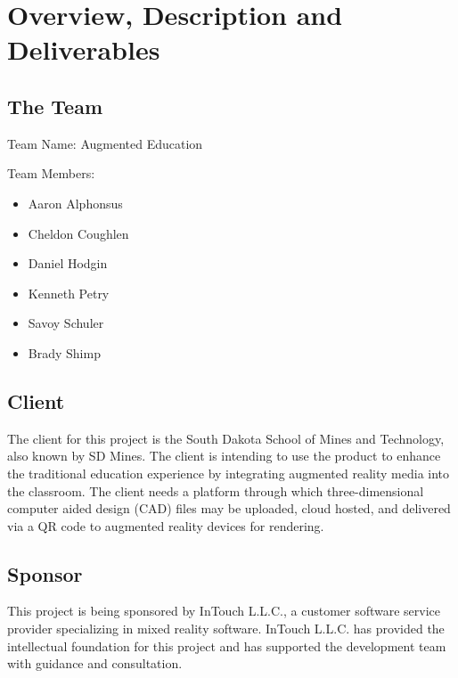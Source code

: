 

\chapter{Overview, Description and Deliverables}


\section{The Team}

Team Name: Augmented Education

\noindent Team Members:
\begin{itemize}
	\item Aaron Alphonsus
	\item Cheldon Coughlen
	\item Daniel Hodgin
	\item Kenneth Petry
	\item Savoy Schuler
	\item Brady Shimp
\end{itemize}

\section{Client}

The client for this project is the South Dakota School of Mines and Technology, also known by SD Mines. The client is intending to use the product to enhance the traditional education experience by integrating augmented reality media into the classroom. The client needs a platform through which three-dimensional computer aided design (CAD) files may be uploaded, cloud hosted, and delivered via a QR code to augmented reality devices for rendering.

\section{Sponsor}

This project is being sponsored by InTouch L.L.C., a customer software service provider specializing in mixed reality software. InTouch L.L.C. has provided the intellectual foundation for this project and has supported the development team with guidance and consultation. 


